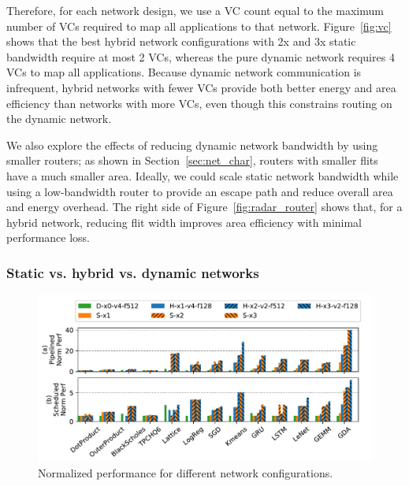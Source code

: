 Therefore, for each network design, we use a VC count equal to the maximum number of VCs required to map all applications to that network. 
Figure~\ref{fig:vc} shows that the best hybrid network configurations with 2x and 3x static bandwidth require at most 2 VCs, whereas the pure dynamic network requires 4 VCs to map all applications.
Because dynamic network communication is infrequent, hybrid networks with fewer VCs provide both better energy and area efficiency than networks with more VCs, even though this constrains routing on the dynamic network.

We also explore the effects of reducing dynamic network bandwidth by using smaller routers;
as shown in Section~\ref{sec:net_char}, routers with smaller flits have a much smaller area.
Ideally, we could scale static network bandwidth while using a low-bandwidth router to provide an escape path and reduce overall area and energy overhead. 
The right side of Figure~\ref{fig:radar_router} shows that, for a hybrid network, reducing flit width improves area efficiency with minimal performance loss. 


\subsubsection{Static vs. hybrid vs. dynamic networks}

\begin{figure}
\centering
\includegraphics[width=1\linewidth]{network/figs/perf.pdf}
  \caption{Normalized performance for different network configurations.}\label{fig:perf}
\end{figure}

